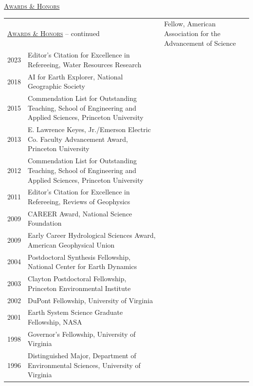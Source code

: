 
\textsc{\underline{Awards \& Honors}}
\vspace*{.1in}

\renewcommand{\arraystretch}{1.2} %
\begin{longtable}{l p{5.5in}}

\endfirsthead
\multicolumn{2}{l}{\hspace{.1in}\textsc{\underline{Awards \& Honors}} -- continued
\vspace*{.1in} }  \endhead

2025 & Fellow, American Association for the Advancement of Science \\
2023 & Editor's Citation for Excellence in Refereeing, Water Resources Research \\
2018 & AI for Earth Explorer, National Geographic Society \\
2015 & Commendation List for Outstanding Teaching, School of Engineering and Applied Sciences, Princeton University \\
2013 & E. Lawrence Keyes, Jr./Emerson Electric Co. Faculty Advancement Award, Princeton University \\
2012 & Commendation List for Outstanding Teaching, School of Engineering and Applied Sciences, Princeton University \\
2011 & Editor's Citation for Excellence in Refereeing, Reviews of Geophysics \\
2009 & CAREER Award, National Science Foundation \\
2009 & Early Career Hydrological Sciences Award, American Geophysical Union \\
2004 & Postdoctoral Synthesis Fellowship, National Center for Earth Dynamics \\
2003 & Clayton Postdoctoral Fellowship, Princeton Environmental Institute \\
2002 & DuPont Fellowship, University of Virginia \\
2001 & Earth System Science Graduate Fellowship, NASA \\
1998 & Governor's Fellowship, University of Virginia \\
1996 & Distinguished Major, Department of Environmental Sciences, University of Virginia \\
\end{longtable}
